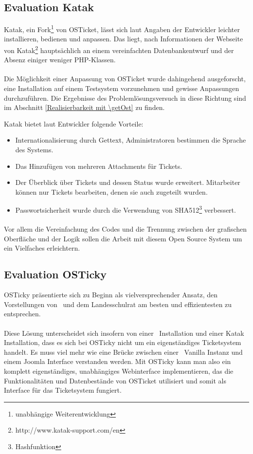 \subsection{Evaluation Katak}
Katak, ein Fork\footnote{unabhängige Weiterentwicklung} von OSTicket, lässt sich laut Angaben der Entwickler leichter installieren, bedienen und anpassen. Das liegt, nach Informationen der Webseite von Katak\footnote{http://www.katak-support.com/en} hauptsächlich an einem vereinfachten Datenbankentwurf und der Absenz einiger weniger PHP-Klassen.
\paragraph{}
Die Möglichkeit einer Anpassung von OSTicket wurde dahingehend ausgeforscht, eine Installation auf einem Testsystem vorzunehmen und gewisse Anpassungen durchzuführen. Die Ergebnisse des Problemlösungsversuch in diese Richtung sind im Abschnitt \ref{Realisierbarkeit mit \getOst} zu finden.

Katak bietet laut Entwickler folgende Vorteile:
\begin{itemize}
	\item Internationalisierung durch Gettext, Administratoren bestimmen die Sprache des Systems.
	\item Das Hinzufügen von mehreren Attachments für Tickets.
	\item Der Überblick über Tickets und dessen Status wurde erweitert. Mitarbeiter können nur Tickets bearbeiten, denen sie auch zugeteilt wurden.
	\item Passwortsicherheit wurde durch die Verwendung von SHA512\footnote{Hashfunktion} verbessert.
\end{itemize}
\paragraph{}
Vor allem die Vereinfachung des Codes und die Trennung zwischen der grafischen Oberfläche und der Logik sollen die Arbeit mit diesem Open Source System um ein Vielfaches erleichtern.
\newpage

\subsection{Evaluation OSTicky}
OSTicky präsentierte sich zu Beginn als vielversprechender Ansatz, den Vorstellungen von \getHammerl\ und dem Landesschulrat am besten und effizientesten zu entsprechen.
\paragraph{}
Diese Lösung unterscheidet sich insofern von einer \getOst\ Installation und einer Katak Installation, dass es sich bei OSTicky nicht um ein eigenständiges Ticketsystem handelt. Es muss viel mehr wie eine Brücke zwischen einer \getOst\ Vanilla Instanz und einem Joomla Interface verstanden werden. Mit OSTicky kann man also ein komplett eigenständiges, unabhängiges Webinterface implementieren, das die Funktionalitäten und Datenbestände von OSTicket utilisiert und somit als Interface für das Ticketsystem fungiert.
